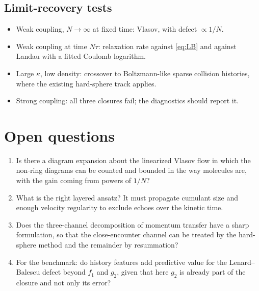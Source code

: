 \documentclass[11pt]{article}
\theoremstyle{definition}
\begin{document}
\subsection{Limit-recovery tests}

\begin{itemize}
  \item Weak coupling, $N\to\infty$ at fixed time: Vlasov, with defect
    $\propto 1/N$.
  \item Weak coupling at time $N\tau$: relaxation rate against
    \eqref{eq:LB} and against Landau with a fitted Coulomb logarithm.
  \item Large $\kappa$, low density: crossover to Boltzmann-like sparse
    collision histories, where the existing hard-sphere track applies.
  \item Strong coupling: all three closures fail; the diagnostics should
    report it.
\end{itemize}

\section{Open questions}

\begin{enumerate}
  \item Is there a diagram expansion about the linearized Vlasov flow in
    which the non-ring diagrams can be counted and bounded in the way
    molecules are, with the gain coming from powers of $1/N$?
  \item What is the right layered ansatz? It must propagate cumulant size
    and enough velocity regularity to exclude echoes over the kinetic time.
  \item Does the three-channel decomposition of momentum transfer have a
    sharp formulation, so that the close-encounter channel can be treated by
    the hard-sphere method and the remainder by resummation?
  \item For the benchmark: do history features add predictive value for the
    Lenard--Balescu defect beyond $f_1$ and $g_2$, given that here $g_2$ is
    already part of the closure and not only its error?
\end{enumerate}
\end{document}
